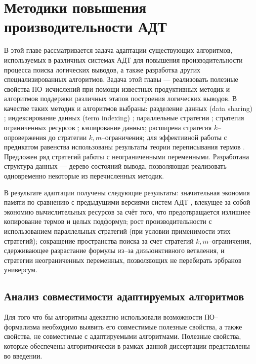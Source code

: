 \chapter{Методики повышения производительности АДТ}

В этой главе рассматривается задача адаптации существующих алгоритмов, используемых в различных системах АДТ для повышения производительности процесса поиска логических выводов, а также разработка других специализированных алгоритмов. Задача этой главы --- реализовать полезные свойства ПО--исчислений при помощи известных продуктивных методик и алгоритмов поддержки различных этапов построения логических выводов. В качестве таких методик и алгоритмов выбраны: разделение данных (data sharing) \cite{Che2, Ryazanov2003}; индексирование данных (term indexing) \cite{HARIndex, TermIndexingBook,pathindex}; параллельные стратегии \cite{PSETHEO}; стратегия ограниченных ресурсов \cite{Ryazanov2003}; кэширование данных; расширена стратегия $k$--опровержения \cite{ICDS2000, dissChe} до стратегии $k,m$--ограничения; для эффективной работы с предикатом равенства использованы результаты теории переписывания термов \cite{Nipkow}. Предложен ряд стратегий работы с неограниченными переменными. Разработана структура данных --- дерево состояний вывода, позволяющая реализовать одновременно некоторые из перечисленных методик.

В результате адаптации получены следующие результаты: значительная экономия памяти по сравнению с предыдущими версиями систем АДТ \cite{dissChe}, влекущее за собой экономию вычислительных ресурсов за счёт того, что предотвращается излишнее копирование термов и целых подформул; рост производительности с использованием параллельных стратегий (при условии применимости этих стратегий); сокращение пространства поиска за счет стратегий $k,m$--ограничения, сдерживающее разрастание формулы из--за дизъюнктивного ветвления, и стратегии неограниченных переменных, позволяющих не перебирать эрбранов универсум.

\section{Анализ совместимости адаптируемых алгоритмов}

Для того что бы алгоритмы адекватно использовали возможности ПО--формализма необходимо выявить его совместимые полезные свойства, а также свойства, не совместимые с адаптируемыми алгоритмами.  Полезные свойства, которые обеспечены алгоритмически в рамках данной диссертации представлены во введении.

